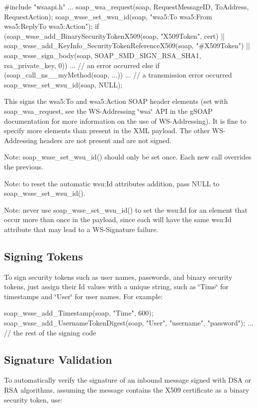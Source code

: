 \begin{DoxyCode}
    #include "wsaapi.h"
    ...
    soap_wsa_request(soap, RequestMessageID, ToAddress, RequestAction);
    soap_wsse_set_wsu_id(soap, "wsa5:To wsa5:From wsa5:ReplyTo wsa5:Action");
    if (soap_wsse_add_BinarySecurityTokenX509(soap, "X509Token", cert)
     || soap_wsse_add_KeyInfo_SecurityTokenReferenceX509(soap, "#X509Token")
     || soap_wsse_sign_body(soap, SOAP_SMD_SIGN_RSA_SHA1, rsa_private_key, 0))
      ... // an error occurred
    else if (soap_call_ns__myMethod(soap, ...))
      ... // a transmission error occurred
    soap_wsse_set_wsu_id(soap, NULL);
\end{DoxyCode}
 This signs the wsa5:To and wsa5:Action SOAP header elements (set with soap\_\-wsa\_\-request, see the WS-\/Addressing \char`\"{}wsa\char`\"{} API in the gSOAP documentation for more information on the use of WS-\/Addressing). It is fine to specify more elements than present in the XML payload. The other WS-\/Addressing headers are not present and are not signed.

Note: soap\_\-wsse\_\-set\_\-wsu\_\-id() should only be set once. Each new call overrides the previous.

Note: to reset the automatic wsu:Id attributes addition, pass NULL to soap\_\-wsse\_\-set\_\-wsu\_\-id().

Note: never use soap\_\-wsse\_\-set\_\-wsu\_\-id() to set the wsu:Id for an element that occur more than once in the payload, since each will have the same wsu:Id attribute that may lead to a WS-\/Signature failure.\hypertarget{wsse_wsse_8_3}{}\subsection{Signing Tokens}\label{wsse_wsse_8_3}
To sign security tokens such as user names, passwords, and binary security tokens, just assign their Id values with a unique string, such as \char`\"{}Time\char`\"{} for timestamps and \char`\"{}User\char`\"{} for user names. For example:


\begin{DoxyCode}
    soap_wsse_add_Timestamp(soap, "Time", 600);
    soap_wsse_add_UsernameTokenDigest(soap, "User", "username", "password");
    ... // the rest of the signing code
\end{DoxyCode}
\hypertarget{wsse_wsse_8_4}{}\subsection{Signature Validation}\label{wsse_wsse_8_4}
To automatically verify the signature of an inbound message signed with DSA or RSA algorithms, assuming the message contains the X509 certificate as a binary security token, use:


